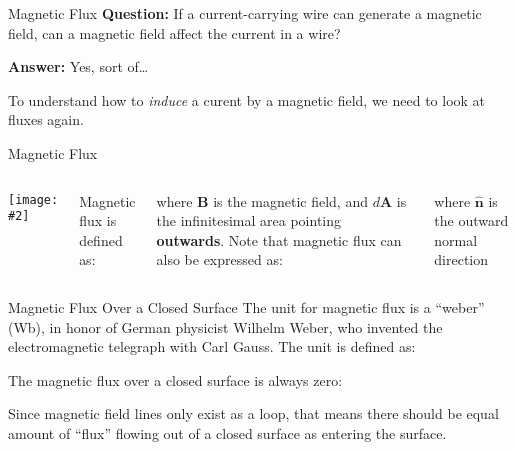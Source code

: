 \documentclass[12pt,aspectratio=169]{beamer}
\newcommand{\pic}[2]{\texttt{[image: \#2]}}
\newcommand{\mb}[1]{\mathbf{#1}}
\newcommand{\eq}[2]{\vspace{#1}{\Large\begin{displaymath}#2\end{displaymath}}}
\begin{document}
\begin{frame}{Magnetic Flux}
  \textbf{Question:} If a current-carrying wire can generate a magnetic field,
  can a magnetic field affect the current in a wire?

  \vspace{.3in}\textbf{Answer:} Yes, sort of\ldots

  \vspace{.3in}To understand how to \emph{induce} a curent by a magnetic field,
  we need to look at fluxes again.
\end{frame}


\begin{frame}{Magnetic Flux}
  \begin{columns}
    \pic{1.1}{flux2.png}
  
    Magnetic flux is defined as:
    
    \eq{-.15in}{
      \boxed{\Phi_M=\int\mb{B}\cdot d\mb{A}}
    }
    
    where $\mb{B}$ is the magnetic field, and $d\mb{A}$ is the infinitesimal
    area pointing \textbf{outwards}. Note that magnetic flux can also be
    expressed as:

    \eq{-.2in}{
      \boxed{\Phi_M=\int\mb{B}\cdot\hat{\mb{n}}dA}
    }

    where $\hat{\mb{n}}$ is the outward normal direction
  \end{columns}
\end{frame}



\begin{frame}{Magnetic Flux Over a Closed Surface}
  The unit for magnetic flux is a ``weber'' (\si{\weber}), in honor of German
  physicist Wilhelm Weber, who invented the electromagnetic telegraph with Carl
  Gauss. The unit is defined as:

  \eq{-.3in}{\SI{1}{\weber}=\SI{1}{\tesla.\metre^2}}
  
  \vspace{-.2in}The magnetic flux over a closed surface is always zero:

  \eq{-.2in}{
    \boxed{\oint\mb{B}\cdot d\mb{A}=0}
  }

  Since magnetic field lines only exist as a loop, that means there should be
  equal amount of ``flux'' flowing out of a closed surface as entering the
  surface.
\end{frame}
\end{document}
